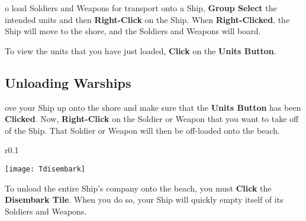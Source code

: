 o load Soldiers and Weapons for transport onto a Ship, \textbf{Group Select} the intended units and then \textbf{Right-Click} on the Ship. When \textbf{Right-Clicked}, the Ship will move to the shore, and the Soldiers and Weapons will board.

To view the units that you have just loaded, \textbf{Click} on the \textbf{Units Button}.

\subsection{\textsf{Unloading Warships}}

ove your Ship up onto the shore and make sure that the \textbf{Units Button} has been \textbf{Clicked}. Now, \textbf{Right-Click} on the Soldier or Weapon that you want to take off of the Ship. That Soldier or Weapon will then be off-loaded onto the beach.

\begin{wrapfigure}{r}{0.1\textwidth}
    \vspace{-20pt}
    \begin{center}
        \texttt{[image: Tdisembark]}
    \end{center}
    \vspace{-20pt}
\end{wrapfigure}

To unload the entire Ship’s company onto the beach, you must \textbf{Click} the \textbf{Disembark Tile}. When you do so, your Ship will quickly empty itself of its Soldiers and Weapons.